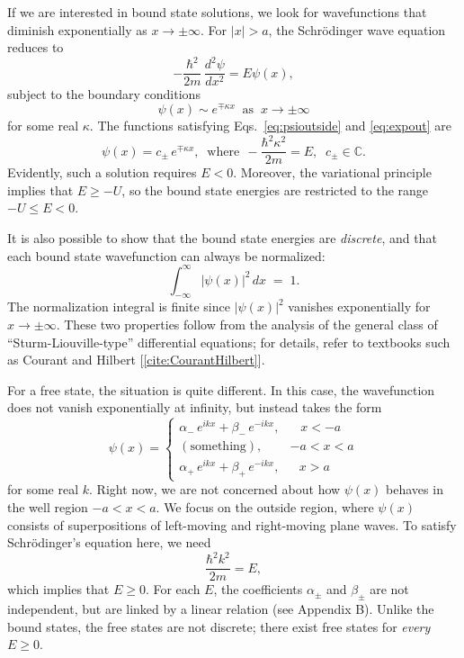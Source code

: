 \documentclass[pra,12pt]{revtex4}
\begin{document}
If we are interested in bound state solutions, we look for
wavefunctions that diminish exponentially as $x \rightarrow
\pm\infty$.  For $|x| > a$, the Schr\"odinger wave equation reduces to
\begin{equation}
  -\frac{\hbar^2}{2m}\,\frac{d^2\psi}{dx^2} = E \psi(x),
  \label{eq:psioutside}
\end{equation}
subject to the boundary conditions
\begin{equation}
  \psi(x) \sim e^{\mp\kappa x} \;\; \textrm{as} \;\; x \rightarrow \pm \infty
  \label{eq:expout}
\end{equation}
for some real $\kappa$.  The functions satisfying
Eqs.~\eqref{eq:psioutside} and \eqref{eq:expout} are
\begin{equation}
  \psi(x) = c_\pm\, e^{\mp\kappa x}, \;\;\mathrm{where}\;\, -\frac{\hbar^2\kappa^2}{2m} = E, \;\; c_\pm \in \mathbb{C}.
\end{equation}
Evidently, such a solution requires $E < 0$.  Moreover, the
variational principle implies that $E \ge -U$, so the bound state
energies are restricted to the range $-U \le E < 0$.

It is also possible to show that the bound state energies are
\textit{discrete}, and that each bound state wavefunction can always
be normalized:
\begin{equation}
  \int_{-\infty}^\infty |\psi(x)|^2\, dx\; =\; 1.
\end{equation}
The normalization integral is finite since $|\psi(x)|^2$ vanishes
exponentially for $x \rightarrow \pm \infty$.  These two properties
follow from the analysis of the general class of
``Sturm-Liouville-type'' differential equations; for details, refer to
textbooks such as Courant and Hilbert [\ref{cite:CourantHilbert}].

For a free state, the situation is quite different.  In this case, the
wavefunction does not vanish exponentially at infinity, but instead
takes the form
\begin{equation}
  \psi(x) = \begin{cases} \alpha_-\, e^{ik x} + \beta_-\, e^{-ik x}, & \;\;\;x < -a\\ (\mathrm{something}) , & -a < x < a\\ \alpha_+\, e^{ik x} + \beta_+\, e^{-ik x} , & \;\;\,x > a\end{cases}
\end{equation}
for some real $k$.  Right now, we are not concerned about how
$\psi(x)$ behaves in the well region $-a < x < a$.  We focus on the
outside region, where $\psi(x)$ consists of superpositions of
left-moving and right-moving plane waves.  To satisfy Schr\"odinger's
equation here, we need
\begin{equation}
  \frac{\hbar^2k^2}{2m} = E,
\end{equation}
which implies that $E \ge 0$.  For each $E$, the coefficients
$\alpha_\pm$ and $\beta_\pm$ are not independent, but are linked by a
linear relation (see Appendix B).  Unlike the bound states, the free
states are not discrete; there exist free states for \textit{every} $E
\ge 0$.
\end{document}
